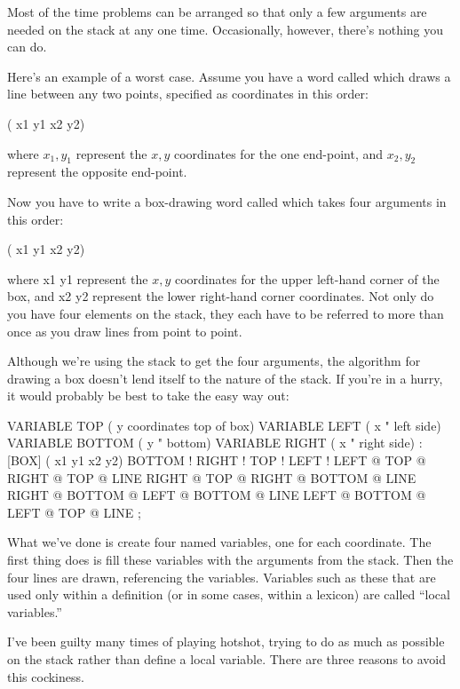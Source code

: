 Most of the time problems can be arranged so that only a few arguments
are needed on the stack at any one time. Occasionally, however, there's
nothing you can do.

Here's an example of a worst case. Assume you have a word called
 which draws a line between any two points, specified as
coordinates in this order:

\begin{Code}
( x1 y1 x2 y2)
\end{Code}
where $x_1,y_1$ represent the $x,y$ coordinates for the one end-point, and
$x_2,y_2$ represent the opposite end-point.

Now you have to write a box-drawing word called \forth{[BOX]} which
takes four arguments in this order:

\begin{Code}
( x1 y1 x2 y2)
\end{Code}
where x1 y1 represent the $x,y$ coordinates for the upper left-hand corner
of the box, and x2 y2 represent the lower right-hand corner coordinates.
Not only do you have four elements on the stack, they each have to
be referred to more than once as you draw lines from point to point.

Although we're using the stack to get the four arguments, the algorithm
for drawing a box doesn't lend itself to the nature of the stack. If you're
in a hurry, it would probably be best to take the easy way out:

\begin{Code}
VARIABLE TOP         ( y coordinates top of box)
VARIABLE LEFT        ( x     "       left side)
VARIABLE BOTTOM      ( y     "       bottom)
VARIABLE RIGHT       ( x     "       right side)
: [BOX]   ( x1 y1 x2 y2)   BOTTOM !  RIGHT !  TOP !  LEFT !
   LEFT @ TOP @  RIGHT @ TOP @  LINE
   RIGHT @ TOP @  RIGHT @ BOTTOM @  LINE
   RIGHT @ BOTTOM @  LEFT @ BOTTOM @  LINE
   LEFT @ BOTTOM @  LEFT @ TOP @  LINE ;
\end{Code}
What we've done is create four named variables, one for each coordinate.
The first thing \forth{[BOX]} does is fill these variables with the
arguments from the stack. Then the four lines are drawn, referencing the
variables.  Variables such as these that are used only within a definition
(or in some cases, within a lexicon) are called ``local variables.''

I've been guilty many times of playing hotshot, trying to do as
much as possible on the stack rather than define a local variable. There
are three reasons to avoid this cockiness.

